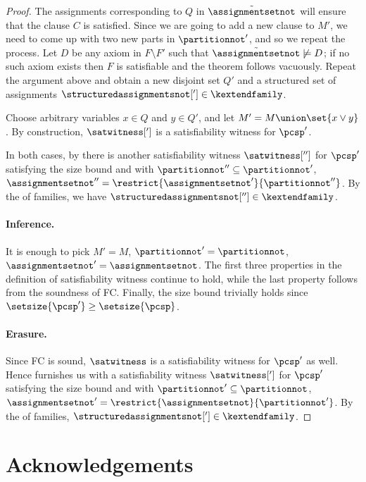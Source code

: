 \documentclass{toc}
\begin{document}
\begin{proof}
The assignments corresponding to $Q$ in $\tilde{\assignmentsetnot}$ will ensure that the clause $C$ is satisfied. Since we are going to add a new clause to $M'$, we need to come up with two new parts in $\partitionnot'$, and so we repeat the process. Let $D$ be any axiom in $F\setminus F'$ such that $\tilde{\assignmentsetnot}\not\models D$; if no such axiom exists then $F$ is satisfiable and the theorem follows vacuously. Repeat the argument above and obtain a new disjoint set $Q'$ and a structured set of assignments $\structuredassignmentsnot['] \in \kextendfamily$.

Choose arbitrary variables $x \in Q$ and $y \in Q'$, and let $M'=M\union\set{x\lor y}$. By construction, $\satwitness[']$ is a satisfiability witness for $\pcsp'$.

In both cases, by  there is another satisfiability witness $\satwitness['']$ for $\pcsp'$ satisfying the size bound and with $\partitionnot''\subseteq\partitionnot'$, $\assignmentsetnot''=\restrict{\assignmentsetnot'}{\partitionnot''}$. By the \restrictionproperty of \kextendibleNok families, we have $\structuredassignmentsnot[''] \in \kextendfamily$.

%
\paragraph{Inference.} It is enough to pick $M'=M$, $\partitionnot'=\partitionnot$, $\assignmentsetnot'=\assignmentsetnot$. The first three properties in the definition of satisfiability witness continue to hold, while the last property follows from the soundness of FC\@. Finally, the size bound trivially holds since $\setsize{\pcsp'} \geq \setsize{\pcsp}$.

%
\paragraph{Erasure.} Since FC is sound, $\satwitness$ is a satisfiability witness for $\pcsp'$ as well. Hence  furnishes us with a satisfiability witness $\satwitness[']$ for $\pcsp'$ satisfying the size bound and with $\partitionnot'\subseteq\partitionnot$, $\assignmentsetnot'=\restrict{\assignmentsetnot}{\partitionnot'}$. By the \restrictionproperty of \kextendibleNok families, $\structuredassignmentsnot['] \in \kextendfamily$.
\end{proof}

\section*{Acknowledgements}
\end{document}
